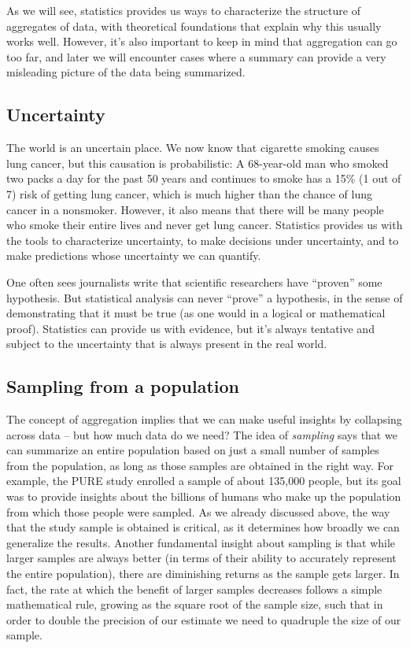 \documentclass[12pt,]{book}
\theoremstyle{definition}
\theoremstyle{definition}
\theoremstyle{definition}
\theoremstyle{remark}
\begin{document}
As we will see, statistics provides us ways to characterize the structure of aggregates of data, with theoretical foundations that explain why this usually works well. However, it's also important to keep in mind that aggregation can go too far, and later we will encounter cases where a summary can provide a very misleading picture of the data being summarized.

\hypertarget{uncertainty}{%
\subsection{Uncertainty}\label{uncertainty}}

The world is an uncertain place. We now know that cigarette smoking causes lung cancer, but this causation is probabilistic: A 68-year-old man who smoked two packs a day for the past 50 years and continues to smoke has a 15\% (1 out of 7) risk of getting lung cancer, which is much higher than the chance of lung cancer in a nonsmoker. However, it also means that there will be many people who smoke their entire lives and never get lung cancer. Statistics provides us with the tools to characterize uncertainty, to make decisions under uncertainty, and to make predictions whose uncertainty we can quantify.

One often sees journalists write that scientific researchers have ``proven'' some hypothesis. But statistical analysis can never ``prove'' a hypothesis, in the sense of demonstrating that it must be true (as one would in a logical or mathematical proof). Statistics can provide us with evidence, but it's always tentative and subject to the uncertainty that is always present in the real world.

\hypertarget{sampling-from-a-population}{%
\subsection{Sampling from a population}\label{sampling-from-a-population}}

The concept of aggregation implies that we can make useful insights by collapsing across data -- but how much data do we need? The idea of \emph{sampling} says that we can summarize an entire population based on just a small number of samples from the population, as long as those samples are obtained in the right way. For example, the PURE study enrolled a sample of about 135,000 people, but its goal was to provide insights about the billions of humans who make up the population from which those people were sampled. As we already discussed above, the way that the study sample is obtained is critical, as it determines how broadly we can generalize the results. Another fundamental insight about sampling is that while larger samples are always better (in terms of their ability to accurately represent the entire population), there are diminishing returns as the sample gets larger. In fact, the rate at which the benefit of larger samples decreases follows a simple mathematical rule, growing as the square root of the sample size, such that in order to double the precision of our estimate we need to quadruple the size of our sample.
\end{document}
